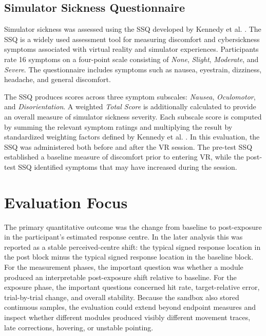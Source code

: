 \subsection{Simulator Sickness Questionnaire}
\label{subsec:evaluation-ssq}

Simulator sickness was assessed using the SSQ developed by Kennedy et al. \cite{KennedySSQ}. The SSQ is a widely used assessment tool for measuring discomfort and cybersickness symptoms associated with virtual reality and simulator experiences. Participants rate 16 symptoms on a four-point scale consisting of \emph{None}, \emph{Slight}, \emph{Moderate}, and \emph{Severe}. The questionnaire includes symptoms such as nausea, eyestrain, dizziness, headache, and general discomfort.

The SSQ produces scores across three symptom subscales: \emph{Nausea}, \emph{Oculomotor}, and \emph{Disorientation}. A weighted \emph{Total Score} is additionally calculated to provide an overall measure of simulator sickness severity. Each subscale score is computed by summing the relevant symptom ratings and multiplying the result by standardized weighting factors defined by Kennedy et al. \cite{KennedySSQ}. In this evaluation, the SSQ was administered both before and after the VR session. The pre-test SSQ established a baseline measure of discomfort prior to entering VR, while the post-test SSQ identified symptoms that may have increased during the session.

\section{Evaluation Focus}
\label{sec:evaluation-focus}

The primary quantitative outcome was the change from baseline to post-exposure in the participant's estimated response centre. In the later analysis this was reported as a stable perceived-centre shift: the typical signed response location in the post block minus the typical signed response location in the baseline block. For the measurement phases, the important question was whether a module produced an interpretable post-exposure shift relative to baseline. For the exposure phase, the important questions concerned hit rate, target-relative error, trial-by-trial change, and overall stability. Because the sandbox also stored continuous samples, the evaluation could extend beyond endpoint measures and inspect whether different modules produced visibly different movement traces, late corrections, hovering, or unstable pointing.

